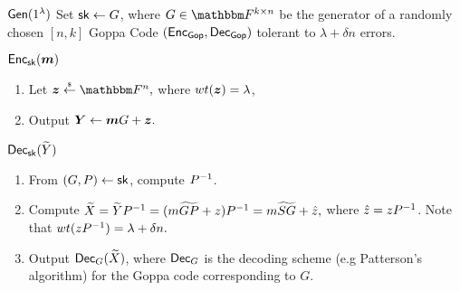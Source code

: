\begin{construction}\label{constr:Rse}
\begin{weirdFrame}{$\mathsf{Gen}(1^\lambda)$}
   Set $\mathsf{sk} \leftarrow G$, where $G \in \F^{k \times n}$ be the generator of a randomly chosen $[n,k]$ Goppa Code $(\mathsf{Enc}_{\mathsf{Gop}},\mathsf{Dec}_{\mathsf{Gop}})$ tolerant to $\lambda + \delta n$ errors.

\end{weirdFrame}

\begin{weirdFrame}{$\mathsf{Enc}_{\mathsf{sk}}(\boldsymbol{m})$}
    \begin{enumerate}
        \item Let $\bz \unif \F^n,$ where $wt(\boldsymbol{z}) = \lambda$,
        \item Output $\boldsymbol{Y} \leftarrow \boldsymbol{m} G + \boldsymbol{z}.$ 
    \end{enumerate}
\end{weirdFrame}
\begin{weirdFrame}{$\mathsf{Dec}_{\mathsf{sk}}(\widetilde{Y})$}
    \begin{enumerate}
        \item From $(G,P) \leftarrow \mathsf{sk}$, compute $P^{-1}$.
        \item Compute $\widetilde X = \widetilde Y P^{-1} = (m\widetilde{GP} + z) P^{-1} = m \widetilde{SG} + \hat z,$ where $\hat z = z P^{-1}$. 
        Note that $wt(z P^{-1}) = \lambda + \delta n.$
        \item Output $\mathsf{Dec}_{G}(\widetilde X)$, where $\mathsf{Dec}_{G}$ is the decoding scheme (e.g Patterson's algorithm) for the Goppa code corresponding to $G$.
    \end{enumerate}
\end{weirdFrame}
\end{construction}